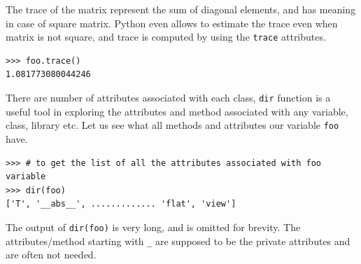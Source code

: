 \documentclass[10pt]{book}
\begin{document}
{The trace of the matrix represent the sum of diagonal elements, and has meaning in case of square matrix. Python even allows to estimate the trace even when matrix is not square, and trace is computed by using the \verb"trace" attributes. 
\beforeverb \begin{verbatim}
>>> foo.trace()
1.081773080044246
\end{verbatim} \afterverb
There are number of attributes associated with each class, \verb"dir" function is a useful tool in exploring the attributes and method associated with any variable, class, library etc. Let us see what all methods and attributes our variable \verb"foo" have.
\beforeverb \begin{verbatim}
>>> # to get the list of all the attributes associated with foo variable
>>> dir(foo)
['T', '__abs__', ............. 'flat', 'view']
\end{verbatim} \afterverb

The output of \verb"dir(foo)" is very long, and is omitted for brevity. The attributes/method starting with \verb"_" are supposed to be the private attributes and are often not needed. 

}
\end{document}
